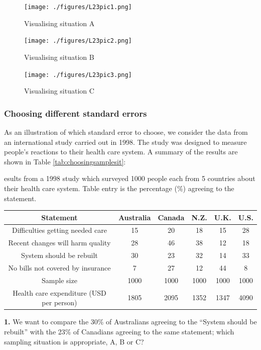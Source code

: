 \documentclass[
  oneside]{krantz}
\begin{document}
\begin{figure}[htbp]
\centering
\texttt{[image: ./figures/L23pic1.png]}
\caption{Visualising situation A\label{L23pic1}}
\end{figure}

\begin{figure}[htbp]
\centering
\texttt{[image: ./figures/L23pic2.png]}
\caption{Visualising situation B\label{L23pic2}}
\end{figure}

\begin{figure}[htbp]
\centering
\texttt{[image: ./figures/L23pic3.png]}
\caption{Visualising situation C\label{L23pic3}}
\end{figure}

\hypertarget{choosing-different-standard-errors}{%
\subsubsection{Choosing different standard errors}\label{choosing-different-standard-errors}}

As an illustration of which standard error to choose, we consider the data from an international study carried out in 1998. The study was designed to measure people's reactions to their health care system. A summary of the results are shown in Table \ref{tab:choosingsamplesit}:

\label{tab:choosingsamplesit} esults from a 1998 study which surveyed 1000 people each from 5 countries
about their health care system. Table entry is the percentage (\%) agreeing to the statement.

\begin{longtable}[]{@{}cccccc@{}}
\toprule
Statement & Australia & Canada & N.Z. & U.K. & U.S.\tabularnewline
\midrule
\endhead
Difficulties getting needed care & 15 & 20 & 18 & 15 & 28\tabularnewline
Recent changes will harm quality & 28 & 46 & 38 & 12 & 18\tabularnewline
System should be rebuilt & 30 & 23 & 32 & 14 & 33\tabularnewline
No bills not covered by insurance & 7 & 27 & 12 & 44 & 8\tabularnewline
Sample size & 1000 & 1000 & 1000 & 1000 & 1000\tabularnewline
Health care expenditure (USD per person) & 1805 & 2095 & 1352 & 1347 & 4090\tabularnewline
\bottomrule
\end{longtable}

\textbf{1.} We want to compare the 30\% of Australians agreeing to the ``System should be rebuilt'' with the 23\% of Canadians agreeing to the same statement; which sampling situation is appropriate, A, B or C?
\end{document}
